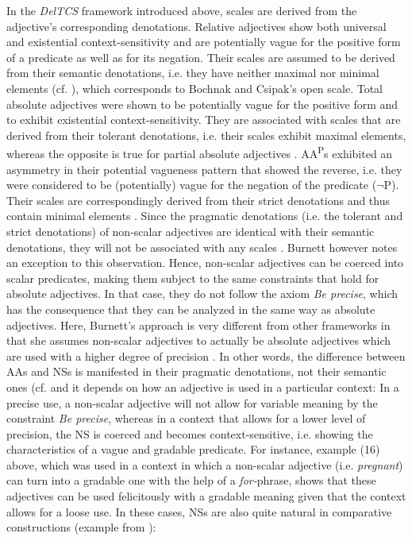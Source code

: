 \documentclass[output=paper
,modfonts
,nonflat]{langsci/langscibook}
\begin{document}
In the \textit{DelTCS} framework introduced above, scales are derived from the adjective's corresponding denotations. Relative adjectives show both universal and existential context-sensitivity and are potentially vague for the positive form of a predicate as well as for its negation. Their scales are assumed to be derived from their semantic denotations, i.e. they have neither maximal nor minimal elements (cf. \citealt[90, 107]{Burnett2017}), which corresponds to Bochnak and Csipak's open scale. Total absolute adjectives were shown to be potentially vague for the positive form and to exhibit existential context-sensitivity. They are associated with scales that are derived from their tolerant denotations, i.e. their scales exhibit maximal elements, whereas the opposite is true for partial absolute adjectives \citeyearpar[90, 106]{Burnett2017}. AA\textsuperscript{P}s exhibited an asymmetry in their potential vagueness pattern that showed the reverse, i.e. they were considered to be (potentially) vague for the negation of the predicate ($\neg$P). Their scales are correspondingly derived from their strict denotations and thus contain minimal elements \citeyearpar[90,106]{Burnett2017}. Since the pragmatic denotations (i.e. the tolerant and strict denotations) of non-scalar adjectives are identical with their semantic denotations, they will not be associated with any scales \citet[90]{Burnett2017}. Burnett however notes an exception to this observation. Hence, non-scalar adjectives can be coerced into scalar predicates, making them subject to the same constraints that hold for absolute adjectives. In that case, they do not follow the axiom \textit{Be precise}, which has the consequence that they can be analyzed in the same way as absolute adjectives. Here, Burnett's approach is very different from other frameworks in that she assumes non-scalar adjectives to actually be absolute adjectives which are used with a higher degree of precision \citeyearpar[97--98]{Burnett2017}. In other words, the difference between AAs and NSs is manifested in their pragmatic denotations, not their semantic ones (cf. \textcite[98]{Burnett2017} and it depends on how an adjective is used in a particular context: In a precise use, a non-scalar adjective will not allow for variable meaning by the constraint \textit{Be precise}, whereas in a context that allows for a lower level of precision, the NS is coerced and becomes context-sensitive, i.e. showing the characteristics of a vague and gradable predicate. For instance, example (16) above, which was used in a context in which a non-scalar adjective (i.e. \textit{pregnant}) can turn into a gradable one with the help of a \textit{for-}phrase, shows that these adjectives can be used felicitously with a gradable meaning given that the context allows for a loose use. In these cases, NSs are also quite natural in comparative constructions (example from \citealt[96]{Burnett2017}):
\end{document}

